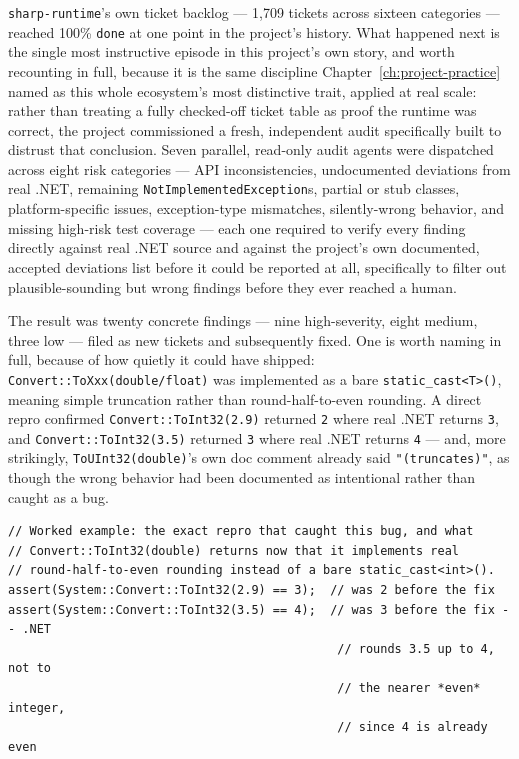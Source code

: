 \texttt{sharp-runtime}'s own ticket backlog --- 1{,}709 tickets across sixteen categories ---
reached 100\% \texttt{done} at one point in the project's history. What happened next is the
single most instructive episode in this project's own story, and worth recounting in full,
because it is the same discipline Chapter~\ref{ch:project-practice} named as this whole
ecosystem's most distinctive trait, applied at real scale: rather than treating a fully
checked-off ticket table as proof the runtime was correct, the project commissioned a fresh,
independent audit specifically built to distrust that conclusion. Seven parallel, read-only
audit agents were dispatched across eight risk categories --- API inconsistencies,
undocumented deviations from real .NET, remaining \texttt{NotImplementedException}s, partial
or stub classes, platform-specific issues, exception-type mismatches, silently-wrong
behavior, and missing high-risk test coverage --- each one required to verify every finding
directly against real .NET source and against the project's own documented, accepted
deviations list before it could be reported at all, specifically to filter out
plausible-sounding but wrong findings before they ever reached a human.

The result was twenty concrete findings --- nine high-severity, eight medium, three low ---
filed as new tickets and subsequently fixed. One is worth naming in full, because of how
quietly it could have shipped: \texttt{Convert::ToXxx(double/float)} was implemented as a
bare \texttt{static\_cast<T>()}, meaning simple truncation rather than round-half-to-even
rounding. A direct repro confirmed \texttt{Convert::ToInt32(2.9)} returned \texttt{2} where
real .NET returns \texttt{3}, and \texttt{Convert::ToInt32(3.5)} returned \texttt{3} where real
.NET returns \texttt{4} --- and, more strikingly, \texttt{ToUInt32(double)}'s own doc comment
already said \texttt{"(truncates)"}, as though the wrong behavior had been documented as
intentional rather than caught as a bug.

\begin{lstlisting}
// Worked example: the exact repro that caught this bug, and what
// Convert::ToInt32(double) returns now that it implements real
// round-half-to-even rounding instead of a bare static_cast<int>().
assert(System::Convert::ToInt32(2.9) == 3);  // was 2 before the fix
assert(System::Convert::ToInt32(3.5) == 4);  // was 3 before the fix -- .NET
                                              // rounds 3.5 up to 4, not to
                                              // the nearer *even* integer,
                                              // since 4 is already even
\end{lstlisting}

